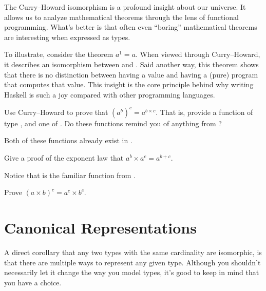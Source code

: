 \documentclass[book.tex]{subfiles}
\begin{document}
The Curry--Howard isomorphism is a profound insight about our universe. It
allows us to analyze mathematical theorems through the lens of functional
programming. What's better is that often even ``boring'' mathematical theorems
are interesting when expressed as types.

To illustrate, consider the theorem $a^1 = a$. When viewed through
Curry--Howard, it describes an isomorphism between  and .
Said another way, this theorem shows that there is no distinction between
having a value and having a (pure) program that computes that value. This
insight is the core principle behind why writing Haskell is such a joy compared
with other programming languages.

\begin{exercise}
  Use Curry--Howard to prove that $(a^b)^c = a^{b\times c}$. That is, provide a
  function of type , and one of . Do these functions remind you of anything from
  ?
\end{exercise}
\begin{solution}

  Both of these functions already exist in .
\end{solution}

\begin{exercise}
Give a proof of the exponent law that $a^b \times a^c = a^{b+c}$.
\end{exercise}
\begin{solution}

  Notice that  is the familiar  function from .
\end{solution}

\begin{exercise}
Prove $(a\times b)^c = a^c \times b^c$.
\end{exercise}
\begin{solution}
\end{solution}


\section{Canonical Representations}

A direct corollary that any two types with the same cardinality are isomorphic,
is that there are multiple ways to represent any given type. Although you
shouldn't necessarily let it change the way you model types, it's good to keep
in mind that you have a choice.
\end{document}
